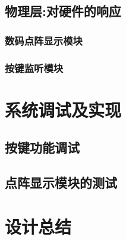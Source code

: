 \documentclass[pdfCover]{myreport} %
\begin{document}
  \subsection{物理层:对硬件的响应}
    
    \subsubsection{数码点阵显示模块}
      

    \subsubsection{按键监听模块}
      


\section{系统调试及实现}
  \subsection{按键功能调试}
    
  \subsection{点阵显示模块的测试}
    

\newpage
\section{设计总结}
  



\nocite{*}
\end{document}
